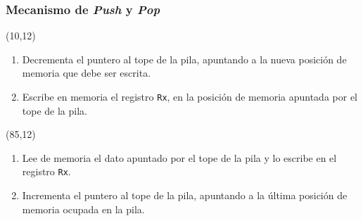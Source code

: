 \documentclass[aspectratio=169]{beamer}
\begin{document}
\begin{frame}[t,fragile]
    \frametitle{Mecanismo de \emph{Push} y \emph{Pop}}
    \begin{textblock}{65}(10,12)
    \begin{enumerate}
     \item<2-> Decrementa el puntero al tope de la pila, apuntando a la nueva posición de memoria que debe ser escrita.
     \item<3-> Escribe en memoria el registro \texttt{Rx}, en la posición de memoria apuntada por el tope de la pila.
    \end{enumerate}
    \end{textblock}
    \begin{textblock}{65}(85,12)
    \begin{enumerate}
     \item<5-> Lee de memoria el dato apuntado por el tope de la pila y lo escribe en el registro \texttt{Rx}.
     \item<6-> Incrementa el puntero al tope de la pila, apuntando a la última posición de memoria ocupada en la pila.
    \end{enumerate}
    \end{textblock}
\end{frame}
\end{document}
